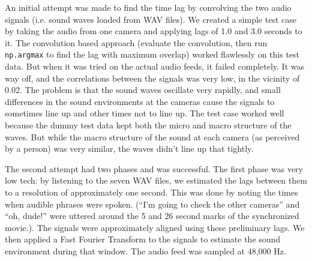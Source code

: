 \documentclass{article}
\begin{document}
An initial attempt was made to find the time lag by convolving the two audio signals 
(i.e. sound waves loaded from WAV files).  
We created a simple test case by taking the audio from one camera and applying lags of 1.0 and 3.0 seconds to it.
The convolution based approach (evaluate the convolution, then run \texttt{np.argmax} to find the lag with maximum overlap)
worked flawlessly on this test data.  But when it was tried on the actual audio feeds, it failed completely.  
It was way off, and the correlations between the signals was very low, in the vicinity of 0.02.
The problem is that the sound waves oscillate very rapidly, and small differences in the sound environments
at the cameras cause the signals to sometimes line up and other times not to line up.
The test case worked well because the dummy test data kept both the micro and macro structure of the waves.
But while the macro structure of the sound at each camera (as perceived by a person) was very similar,
the waves didn't line up that tightly.

The second attempt had two phases and was successful.  The first phase was very low tech:
by listening to the seven WAV files, we estimated the lags between them to a resolution of approximately one second.
This was done by noting the times when audible phrases were spoken.  
(``I'm going to check the other cameras'' and ``oh, dude!'' were uttered 
around the 5 and 26 second marks of the synchronized movie.).
The signals were approximately aligned using these preliminary lags.
We then applied a Fast Fourier Transform to the signals to estimate the sound environment during that window.
The audio feed was sampled at 48,000 Hz.  
\end{document}

